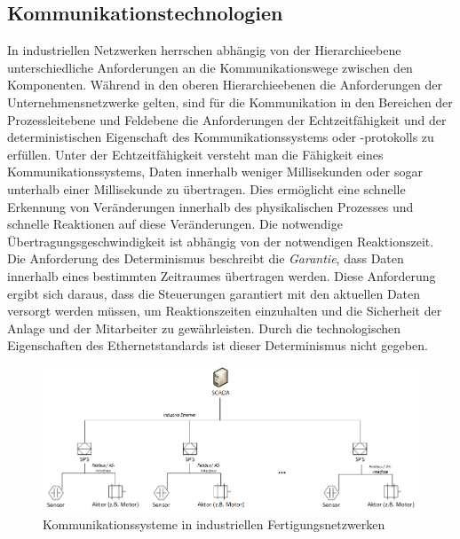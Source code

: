 \subsection{Kommunikationstechnologien}
In industriellen Netzwerken herrschen abhängig von der Hierarchieebene unterschiedliche Anforderungen an die Kommunikationswege zwischen den Komponenten. Während in den oberen Hierarchieebenen die Anforderungen der Unternehmensnetzwerke gelten, sind für die Kommunikation in den Bereichen der Prozessleitebene und Feldebene die Anforderungen der Echtzeitfähigkeit und der deterministischen Eigenschaft des Kommunikationssystems oder -protokolls zu erfüllen. Unter der Echtzeitfähigkeit versteht man die Fähigkeit eines Kommunikationssystems, Daten innerhalb weniger Millisekunden oder sogar unterhalb einer Millisekunde zu übertragen. Dies ermöglicht eine schnelle Erkennung von Veränderungen innerhalb des physikalischen Prozesses und schnelle Reaktionen auf diese Veränderungen. Die notwendige Übertragungsgeschwindigkeit ist abhängig von der notwendigen Reaktionszeit. Die Anforderung des Determinismus beschreibt die \textit{Garantie}, dass Daten innerhalb eines bestimmten Zeitraumes übertragen werden. Diese Anforderung ergibt sich daraus, dass die Steuerungen garantiert mit den aktuellen Daten versorgt werden müssen, um Reaktionszeiten einzuhalten und die Sicherheit der Anlage und der Mitarbeiter zu gewährleisten. Durch die technologischen Eigenschaften des Ethernetstandards ist dieser Determinismus nicht gegeben.

\begin{figure}[h]
\centering
\includegraphics[width=150mm]{Zeichnungen/IndustrialSchema.png}
\caption{Kommunikationssysteme in industriellen Fertigungsnetzwerken}
\label{fig:IndustrialSchema}
\end{figure}

